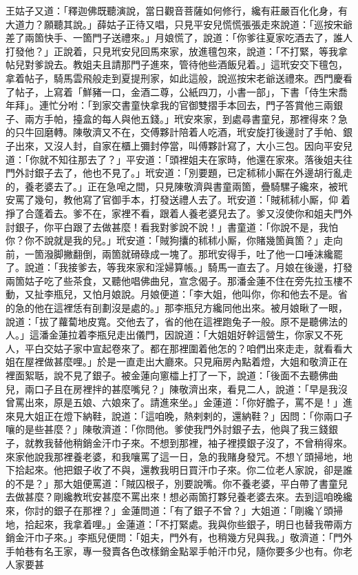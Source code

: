 王姑子又道：「釋迦佛既聽演說，當日觀音菩薩如何修行，纔有莊嚴百化化身，有大道力？願聽其說。」薛姑子正待又唱，只見平安兒慌慌張張走來說道：「巡按宋爺差了兩箇快手、一箇門子送禮來。」月娘慌了，說道：「你爹往夏家吃酒去了，誰人打發他？」正說着，只見玳安兒回馬來家，放進氊包來，說道：「不打緊，等我拿帖兒對爹說去。教姐夫且請那門子進來，管待他些酒飯兒着。」{}這玳安交下氊包，拿着帖子，騎馬雲飛般走到夏提刑家，如此這般，說巡按宋老爺送禮來。西門慶看了帖子，上寫着「鮮豬一口，金酒二尊，公紙四刀，小書一部」，下書「侍生宋喬年拜」。連忙分咐：「到家交書童快拿我的官御雙摺手本回去，門子答賞他三兩銀子、兩方手帕，擡盒的每人與他五錢。」玳安來家，到處尋書童兒，那裡得來？急的只牛回磨轉。陳敬濟又不在，交傅夥計陪着人吃酒，玳安旋打後邊討了手帕、銀子出來，又沒人封，自家在櫃上彌封停當，叫傅夥計寫了，大小三包。因向平安兒道：「你就不知往那去了？」平安道：「頭裡姐夫在家時，他還在家來。落後姐夫往門外討銀子去了，他也不見了。」玳安道：「別要題，已定秫秫小厮在外邊胡行亂走的，養老婆去了。」正在急唣之間，只見陳敬濟與書童兩箇，疊騎騾子纔來，被玳安罵了幾句，教他寫了官御手本，打發送禮人去了。玳安道：「賊秫秫小厮，仰𢵞着掙了合蓬着去。{}爹不在，家裡不看，跟着人養老婆兒去了。爹又沒使你和姐夫門外討銀子，你平白跟了去做甚麼！看我對爹說不說！」書童道：「你說不是，我怕你？你不說就是我的兒。」{}玳安道：「賊狗攮的秫秫小厮，你賭幾箇眞箇？」走向前，一箇潑脚撇翻倒，兩箇就磆碌成一塊了。那玳安得手，吐了他一口唾沫纔罷了。說道：「我接爹去，等我來家和淫婦算帳。」騎馬一直去了。月娘在後邊，打發兩箇姑子吃了些茶食，又聽他唱佛曲兒，宣念偈子。那潘金蓮不住在旁先拉玉樓不動，又扯李瓶兒，又怕月娘說。月娘便道：「李大姐，他叫你，你和他去不是。省的急的他在這裡恁有㓦劃沒是處的。」那李瓶兒方纔同他出來。被月娘瞅了一眼，說道：「拔了蘿蔔地皮寬。交他去了，省的他在這裡跑兔子一般。原不是聽佛法的人。」{}這潘金蓮拉着李瓶兒走出儀門，因說道：「大姐姐好幹這營生，你家又不死人，平白交姑子家中宣起卷來了。都在那裡圍着他怎的？咱們出來走走，就看看大姐在屋裡做甚麼哩。」於是一直走出大廳來。只見廂房內點着燈，大姐和敬濟正在裡面絮聒，說不見了銀子。被金蓮向窻櫺上打了一下，說道：「後面不去聽佛曲兒，兩口子且在房裡拌的甚麼嘴兒？」陳敬濟出來，看見二人，說道：「早是我沒曾罵出來，原是五娘、六娘來了。請進來坐。」金蓮道：「你好膽子，罵不是！」進來見大姐正在燈下納鞋，說道：「這咱晚，熱剌剌的，還納鞋？」因問：「你兩口子嚷的是些甚麼？」陳敬濟道：「你問他。爹使我門外討銀子去，他與了我三錢銀子，就教我替他稍銷金汗巾子來。不想到那裡，袖子裡摸銀子沒了，不曾稍得來。來家他說我那裡養老婆，和我嚷罵了這一日，急的我賭身發咒。不想丫頭掃地，地下拾起來。他把銀子收了不與，還教我明日買汗巾子來。{}你二位老人家說，卻是誰的不是？」那大姐便罵道：「賊囚根子，別要說嘴。你不養老婆，平白帶了書童兒去做甚麼？剛纔教玳安甚麼不罵出來！想必兩箇打夥兒養老婆去來。去到這咱晚纔來，你討的銀子在那裡？」金蓮問道：「有了銀子不曾？」大姐道：「剛纔丫頭掃地，拾起來，我拿着哩。」金蓮道：「不打緊處。我與你些銀子，明日也替我帶兩方銷金汗巾子來。」李瓶兒便問：「姐夫，門外有，也稍幾方兒與我。」敬濟道：「門外手帕巷有名王家，專一發賣各色改樣銷金點翠手帕汗巾兒，隨你要多少也有。你老人家要甚